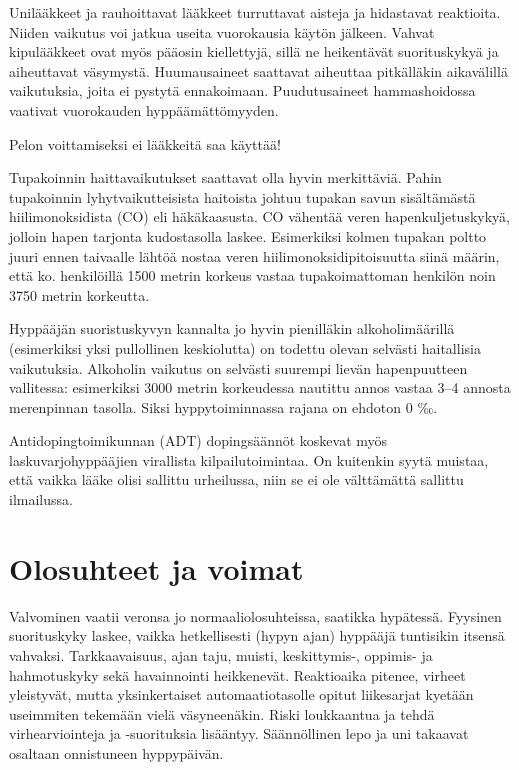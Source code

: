 Unilääkkeet ja rauhoittavat lääkkeet turruttavat aisteja ja hidastavat reaktioita. Niiden vaikutus voi jatkua useita vuorokausia käytön jälkeen. Vahvat kipulääkkeet ovat myös pääosin kiellettyjä, sillä ne heikentävät suorituskykyä ja aiheuttavat väsymystä. Huumausaineet saattavat aiheuttaa pitkälläkin aikavälillä vaikutuksia, joita ei pystytä ennakoimaan. Puudutusaineet hammashoidossa vaativat vuorokauden hyppäämättömyyden. 


Pelon voittamiseksi ei lääkkeitä saa käyttää! 


Tupakoinnin haittavaikutukset saattavat olla hyvin merkittäviä. Pahin tupakoinnin lyhytvaikutteisista haitoista johtuu tupakan savun sisältämästä hiilimonoksidista (CO) eli häkäkaasusta. CO vähentää veren hapenkuljetuskykyä, jolloin hapen tarjonta kudostasolla laskee. Esimerkiksi kolmen tupakan poltto juuri ennen taivaalle lähtöä nostaa veren hiilimonoksidipitoisuutta siinä määrin, että ko. henkilöillä 1500 metrin korkeus vastaa tupakoimattoman henkilön noin 3750 metrin korkeutta.  


Hyppääjän suoristuskyvyn kannalta jo hyvin pienilläkin alkoholimäärillä (esimerkiksi yksi pullollinen keskiolutta) on todettu olevan selvästi haitallisia vaikutuksia. Alkoholin vaikutus on selvästi suurempi lievän hapenpuutteen vallitessa: esimerkiksi 3000 metrin korkeudessa nautittu annos vastaa 3–4 annosta merenpinnan tasolla. Siksi hyppytoiminnassa rajana on ehdoton 0 ‰. 


Antidopingtoimikunnan (ADT) dopingsäännöt koskevat myös laskuvarjohyppääjien virallista kilpailutoimintaa. On kuitenkin syytä muistaa, että vaikka lääke olisi sallittu urheilussa, niin se ei ole välttämättä sallittu ilmailussa. 

\section{ Olosuhteet ja voimat }
\label{fysiologia-olosuhteet-ja-voimat}


Valvominen vaatii veronsa jo normaaliolosuhteissa, saatikka hypätessä. Fyysinen suorituskyky laskee, vaikka hetkellisesti (hypyn ajan) hyppääjä tuntisikin itsensä vahvaksi. Tarkkaavaisuus, ajan taju, muisti, keskittymis\mbox{-,} oppimis- ja hahmotuskyky sekä havainnointi heikkenevät. Reaktioaika pitenee, virheet yleistyvät, mutta yksinkertaiset automaatiotasolle opitut liikesarjat kyetään useimmiten tekemään vielä väsyneenäkin. Riski loukkaantua ja tehdä virhearviointeja ja -suorituksia lisääntyy. Säännöllinen lepo ja uni takaavat osaltaan onnistuneen hyppypäivän. 


